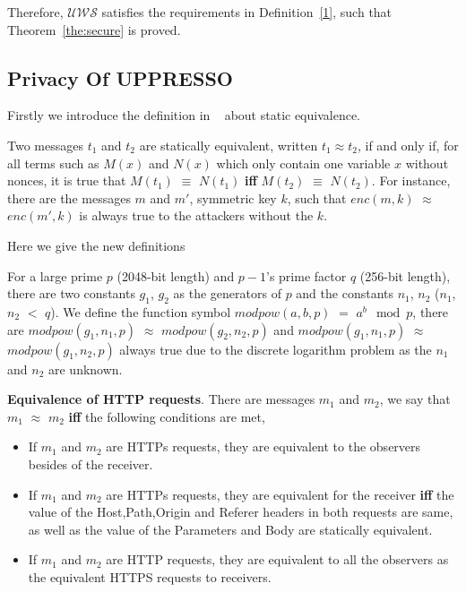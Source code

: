 Therefore,  $\mathcal{UWS}$ satisfies the requirements in Definition~\ref{1}, such that Theorem~\ref{the:secure} is proved. 

\subsection{Privacy Of UPPRESSO}
Firstly we introduce the definition in ~\cite{SPRESSO} about static equivalence.
\begin{definition}
Two messages $t_1$ and $t_2$ are statically equivalent, written $t_1 \approx t_2$, if and only if, for all terms such as $M(x)$ and $N(x)$ which only contain one variable $x$ without nonces, it is true that $M(t_1)$ $\equiv$ $N(t_1)$ \textbf{iff} $M(t_2)$ $\equiv$ $N(t_2)$. For instance, there are the messages $m$ and $m'$, symmetric key $k$, such that $enc(m, k)$ $\approx$ $enc(m', k)$ is always true to the attackers without the $k$.
\label{def:staticequ}
\end{definition}

Here we give the new definitions
\begin{definition}
For a large prime $p$ (2048-bit length) and $p-1$'s prime factor $q$ (256-bit length), there are two constants $g_1$, $g_2$ as the generators of $p$ and the constants $n_1$, $n_2$ ($n_1$, $n_2$ $<$ $q$). We define the function symbol $modpow(a, b, p)$ $=$ $a^b \mod p$, there are $modpow(g_1, n_1, p)$ $\approx$ $modpow(g_2, n_2, p)$ and  $modpow(g_1, n_1, p)$ $\approx$ $modpow(g_1, n_2, p)$  always true due to the discrete logarithm problem as the $n_1$ and $n_2$ are unknown.
\label{def:powequ}
\end{definition}

\begin{definition}
\vspace{1mm}\noindent\textbf{Equivalence of HTTP requests}. There are messages $m_1$ and $m_2$, we say that $m_1$ $\approx$ $m_2$ \textbf{iff} the following conditions are met,
\begin{itemize}
\item If $m_1$ and $m_2$ are HTTPs requests, they are  equivalent to the observers besides of the receiver.
\item If  $m_1$ and $m_2$ are HTTPs requests, they are equivalent for the receiver \textbf{iff} the value of the Host,Path,Origin and Referer headers in both requests are same, as well as the value of the Parameters and Body are statically equivalent.
\item If  $m_1$ and $m_2$ are HTTP requests, they are equivalent to all the observers as the equivalent HTTPS requests to receivers.
\end{itemize}
\label{def:httpequ}
\end{definition}

